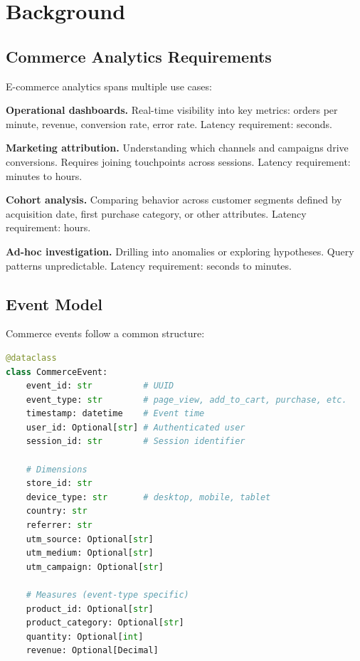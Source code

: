 \section{Background}


\subsection{Commerce Analytics Requirements}

E-commerce analytics spans multiple use cases:

\textbf{Operational dashboards.} Real-time visibility into key metrics: orders per minute, revenue, conversion rate, error rate. Latency requirement: seconds.

\textbf{Marketing attribution.} Understanding which channels and campaigns drive conversions. Requires joining touchpoints across sessions. Latency requirement: minutes to hours.

\textbf{Cohort analysis.} Comparing behavior across customer segments defined by acquisition date, first purchase category, or other attributes. Latency requirement: hours.

\textbf{Ad-hoc investigation.} Drilling into anomalies or exploring hypotheses. Query patterns unpredictable. Latency requirement: seconds to minutes.

\subsection{Event Model}

Commerce events follow a common structure:

\begin{lstlisting}[language=Python,caption=Event schema]
@dataclass
class CommerceEvent:
    event_id: str          # UUID
    event_type: str        # page_view, add_to_cart, purchase, etc.
    timestamp: datetime    # Event time
    user_id: Optional[str] # Authenticated user
    session_id: str        # Session identifier

    # Dimensions
    store_id: str
    device_type: str       # desktop, mobile, tablet
    country: str
    referrer: str
    utm_source: Optional[str]
    utm_medium: Optional[str]
    utm_campaign: Optional[str]

    # Measures (event-type specific)
    product_id: Optional[str]
    product_category: Optional[str]
    quantity: Optional[int]
    revenue: Optional[Decimal]
\end{lstlisting}

